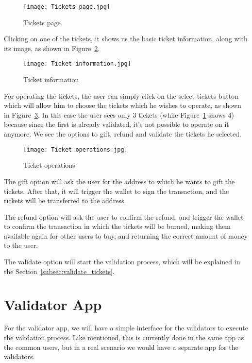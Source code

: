 \begin{figure}[H]
	\texttt{[image: Tickets page.jpg]}
	\centering
	\caption{Tickets page}\label{fig:tickets_page}
\end{figure}

Clicking on one of the tickets, it shows us the basic ticket information, along
with its image, as shown in Figure~\ref{fig:ticket_information}.

\begin{figure}[H]
	\texttt{[image: Ticket information.jpg]}
	\centering
	\caption{Ticket information}\label{fig:ticket_information}
\end{figure}

For operating the tickets, the user can simply click on the select tickets
button which will allow him to choose the tickets which he wishes to operate,
as shown in Figure~\ref{fig:ticket_operations}. In this case the user sees only
3 tickets (while Figure~\ref{fig:tickets_page} shows 4) because since the first
is already validated, it's not possible to operate on it anymore. We see the
options to gift, refund and validate the tickets he selected.

\begin{figure}[H]
	\texttt{[image: Ticket operations.jpg]}
	\centering
	\caption{Ticket operations}\label{fig:ticket_operations}
\end{figure}

The gift option will ask the user for the address to which he wants to gift the
tickets. After that, it will trigger the wallet to sign the transaction, and
the tickets will be transferred to the address.

The refund option will ask the user to confirm the refund, and trigger the
wallet to confirm the transaction in which the tickets will be burned, making
them available again for other users to buy, and returning the correct amount
of money to the user.

The validate option will start the validation process, which will be explained
in the Section~\ref{subsec:validate_tickets}.

\section{Validator App}\label{sec:validator_app}

For the validator app, we will have a simple interface for the validators to
execute the validation process. Like mentioned, this is currently done in the
same app as the common users, but in a real scenario we would have a separate
app for the validators.

